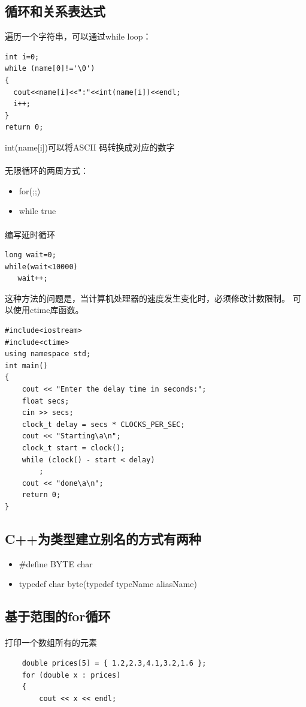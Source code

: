 \documentclass[a4paper,12pt]{article}
\begin{document}
\begin{spacing}{2}
\section{循环和关系表达式}
遍历一个字符串，可以通过while loop：
\begin{lstlisting}
int i=0;
while (name[0]!='\0')
{
  cout<<name[i]<<":"<<int(name[i])<<endl;
  i++;
}
return 0;
\end{lstlisting}
int(name[i])可以将ASCII 码转换成对应的数字
\paragraph{}无限循环的两周方式：
\begin{itemize}
\item for(;;)
\item while true
\end{itemize}
\paragraph{ }编写延时循环
\begin{lstlisting}
long wait=0;
while(wait<10000)
   wait++;
\end{lstlisting}
这种方法的问题是，当计算机处理器的速度发生变化时，必须修改计数限制。
可以使用ctime库函数。
\begin{lstlisting}
#include<iostream>
#include<ctime>
using namespace std;
int main()
{
	cout << "Enter the delay time in seconds:";
	float secs;
	cin >> secs;
	clock_t delay = secs * CLOCKS_PER_SEC;
	cout << "Starting\a\n";
	clock_t start = clock();
	while (clock() - start < delay)
		;
	cout << "done\a\n";
	return 0;
}
\end{lstlisting}
\subsection{C++为类型建立别名的方式有两种}
\begin{itemize}
\item $\#$define BYTE char
\item typedef char byte(typedef typeName aliasName)
\end{itemize}
\subsection{基于范围的for循环}
\paragraph{ }打印一个数组所有的元素
\begin{lstlisting}
    double prices[5] = { 1.2,2.3,4.1,3.2,1.6 };
	for (double x : prices)
	{
		cout << x << endl;


\end{lstlisting}
\end{spacing}
\end{document}
